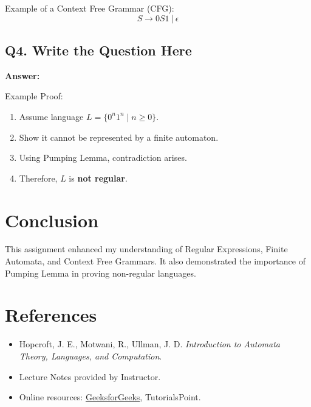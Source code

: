 \documentclass[12pt,a4paper]{article}
\begin{document}
Example of a Context Free Grammar (CFG):  
\[
S \rightarrow 0S1 \ | \ \epsilon
\]

\subsection*{Q4. Write the Question Here}
\textbf{Answer:}  

Example Proof:  
\begin{enumerate}
    \item Assume language $L = \{ 0^n1^n \mid n \geq 0 \}$.
    \item Show it cannot be represented by a finite automaton.
    \item Using Pumping Lemma, contradiction arises.
    \item Therefore, $L$ is \textbf{not regular}.
\end{enumerate}

\section{Conclusion}
This assignment enhanced my understanding of Regular Expressions, Finite Automata, and Context Free Grammars. 
It also demonstrated the importance of Pumping Lemma in proving non-regular languages.

\section{References}
\begin{itemize}
    \item Hopcroft, J. E., Motwani, R., Ullman, J. D. \textit{Introduction to Automata Theory, Languages, and Computation}.
    \item Lecture Notes provided by Instructor.
    \item Online resources: \href{https://www.geeksforgeeks.org/automata-theory/}{GeeksforGeeks}, TutorialsPoint.
\end{itemize}
\end{document}
